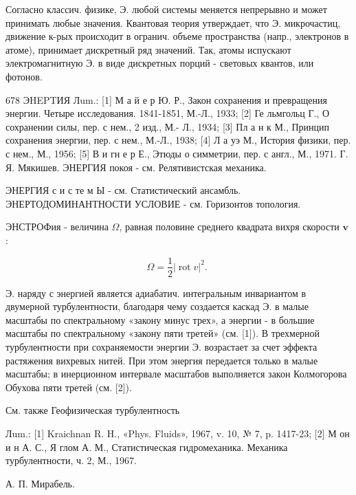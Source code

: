 \documentclass[10pt]{article}
\begin{document}
Согласно классич. физике, Э. любой системы меняется непрерывно и может принимать любые значения. Квантовая теория утверждает, что Э. микрочастиц, движение к-рых происходит в огранич. объеме пространства (напр., электронов в атоме), принимает дискретный ряд значений. Так, атомы испускают электромагнитную Э. в виде дискретных порций - световых квантов, или фотонов.



678 ЭHEPTИЯ Лum.: [1] М а й е р Ю. Р., Закон сохранения и превращения энергии. Четыре исследования. 1841-1851, М.-Л., 1933; [2] Ге льмгольц Г., О сохранении силы, пер. с нем., 2 изд., М.- Л., 1934; [3] Пл а н к М., Принцип сохранения энергии, пер. с нем., М.-Л., 1938; [4] Л а уэ М., История физики, пер. с нем., М., 1956; [5] В и гн е р Е., Этюды о симметрии, пер. с англ., М., 1971. Г. Я. Мякишев. ЭНЕРГИЯ покоя - см. Релятивистская механика.



ЭНЕРГИЯ с и с те м Ы - см. Статистический ансамбль. ЭНЕРТОДОМИНАНТНОСТИ УСЛОВИЕ - см. Горизонтов топология.



ЭНСТРОФия - величина $\Omega$, равная половине среднего квадрата вихря скорости $\boldsymbol{v}$ :



\[

\Omega=\frac{1}{2}|\operatorname{rot} v|^{2} \text {. }

\]



Э. наряду с энергией является адиабатич. интегральным инвариантом в двумерной турбулентности, благодаря чему создается каскад Э. в малые масштабы по спектральному «закону минус трех», а энергии - в большие масштабы по спектральному «закону пяти третей» (см. [1]). В трехмерной турбулентности при сохраняемости энергии Э. возрастает за счет эффекта растяжения вихревых нитей. При этом энергия передается только в малые масштабы; в инерционном интервале масштабов выполняется закон Колмогорова Обухова пяти третей (см. [2]).



См. также Геофизическая турбулентность



Лum.: [1] Kraichnan R. H., «Phys. Fluids», 1967, v. 10, № 7, p. 1417-23; [2] М он и н А. С., Я глом А. М., Статистическая гидромеханика. Механика турбулентности, ч. 2, М., 1967.



А. П. Мирабель.
\end{document}
